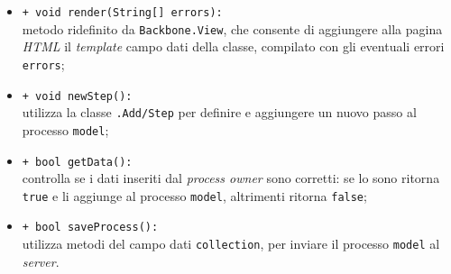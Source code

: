 \begin{flushleft}
\begin{itemize}
\begin{sloppypar}
\begin{itemize}
\item \texttt{+ void render(String[] errors):}\\ metodo ridefinito da \texttt{Backbone.View}, che consente di aggiungere alla pagina \textit{HTML} il \textit{template} campo dati della classe, compilato con gli eventuali errori \texttt{errors};
\item \texttt{+ void newStep():}\\ utilizza la classe \texttt{\logicAdmin{}.Add\fshyp{}Step} per definire e aggiungere un nuovo passo al processo \texttt{model};
\item \texttt{+ bool getData():}\\ controlla se i dati inseriti dal \textit{process owner} sono corretti: se lo sono ritorna \texttt{true} e li aggiunge al processo \texttt{model}, altrimenti ritorna \texttt{false};
\item \texttt{+ bool saveProcess():}\\ utilizza metodi del campo dati \texttt{collection}, per inviare il processo \texttt{model} al \textit{server}.
\end{itemize}
\end{sloppypar}
\end{itemize}
\end{flushleft}

